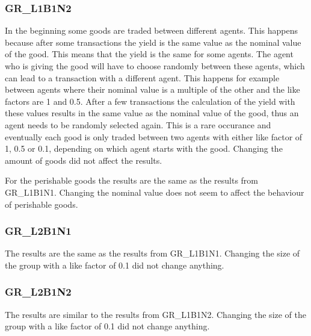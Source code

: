 \documentclass[twoside,openright]{uva-bachelor-thesis}
\begin{document}
\subsubsection{GR\_L1B1N2}
In the beginning some goods are traded between different agents. This happens because after some transactions the yield is the same value as the nominal value of the good. This means that the yield is the same for some agents. The agent who is giving the good will have to choose randomly between these agents, which can lead to a transaction with a different agent. This happens for example between agents where their nominal value is a multiple of the other and the like factors are 1 and 0.5. After a few transactions the calculation of the yield with these values results in the same value as the nominal value of the good, thus an agent needs to be randomly selected again. This is a rare occurance and eventually each good is only traded between two agents with either like factor of 1, 0.5 or 0.1, depending on which agent starts with the good. Changing the amount of goods did not affect the results.

For the perishable goods the results are the same as the results from GR\_L1B1N1. Changing the nominal value does not seem to affect the behaviour of perishable goods.
\subsubsection{GR\_L2B1N1}
The results are the same as the results from GR\_L1B1N1. Changing the size of the group with a like factor of 0.1 did not change anything. 
\subsubsection{GR\_L2B1N2}
The results are similar to the results from GR\_L1B1N2.  Changing the size of the group with a like factor of 0.1 did not change anything. 

\clearpage
\end{document}
